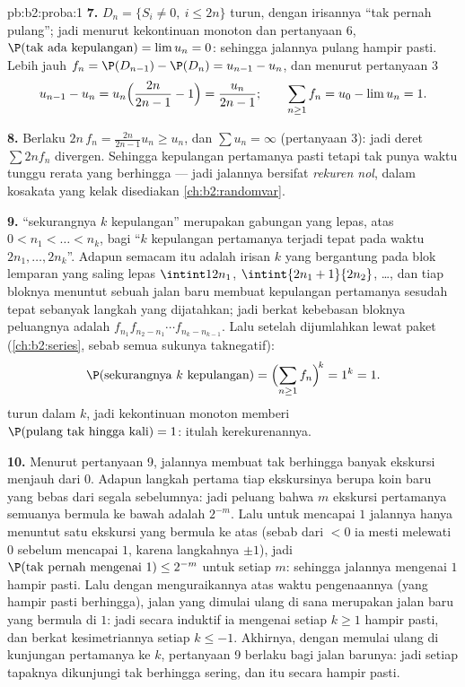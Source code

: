 \begin{solution}{pb:b2:proba:1}
\textbf{7.}  $D_n = \{S_i \neq 0,\ i \leq 2n\}$
turun, dengan irisannya ``tak pernah pulang''; jadi menurut kekontinuan
monoton dan pertanyaan 6, $\P(\text{tak ada kepulangan}) = \lim u_n =
0$: sehingga jalannya pulang hampir pasti. Lebih jauh $f_n = \P(D_{n-1})
- \P(D_n) = u_{n-1} - u_n$, dan menurut pertanyaan 3
\[
u_{n-1} - u_n = u_n\Bigl(\frac{2n}{2n-1} - 1\Bigr) =
\frac{u_n}{2n-1};
\qquad
\sum_{n\geq1}f_n = u_0 - \lim u_n = 1 .
\]

\textbf{8.} Berlaku $2n\,f_n = \frac{2n}{2n-1}u_n \geq u_n$, dan
$\sum u_n = \infty$ (pertanyaan 3): jadi deret $\sum 2nf_n$
divergen. Sehingga kepulangan pertamanya pasti tetapi tak punya waktu tunggu
rerata yang berhingga --- jadi jalannya bersifat \emph{rekuren nol}, dalam
kosakata yang kelak disediakan \cref{ch:b2:randomvar}.

\textbf{9.}  ``sekurangnya $k$ kepulangan'' merupakan
gabungan  yang lepas, atas $0 < n_1 < \dots < n_k$, bagi
 ``$k$ kepulangan pertamanya terjadi tepat pada waktu
$2n_1, \dots, 2n_k$''. Adapun  semacam itu adalah irisan
$k$  yang bergantung pada blok lemparan yang saling lepas
$\intint1{2n_1}$, $\intint{2n_1+1}{2n_2}$, \dots, dan tiap bloknya
menuntut sebuah jalan baru membuat kepulangan pertamanya sesudah
tepat sebanyak langkah yang dijatahkan; jadi berkat kebebasan
bloknya peluangnya adalah $f_{n_1}f_{n_2-n_1}\cdots
f_{n_k-n_{k-1}}$. Lalu setelah dijumlahkan lewat paket (\cref{ch:b2:series},
sebab semua sukunya taknegatif):
\[
\P(\text{sekurangnya }k\text{ kepulangan})
= \Bigl(\sum_{n\geq1}f_n\Bigr)^{\!k} = 1^k = 1 .
\]
 turun dalam $k$, jadi kekontinuan monoton memberi
$\P(\text{pulang tak hingga kali}) = 1$: itulah kerekurenannya.

\textbf{10.} Menurut pertanyaan 9, jalannya membuat tak berhingga banyak
ekskursi menjauh dari $0$. Adapun langkah pertama tiap ekskursinya berupa
koin baru yang bebas dari segala sebelumnya: jadi
peluang bahwa $m$ ekskursi pertamanya semuanya bermula ke bawah
adalah $2^{-m}$. Lalu untuk mencapai $1$ jalannya hanya menuntut satu ekskursi
yang bermula ke atas (sebab dari $<0$ ia mesti melewati $0$ sebelum
mencapai $1$, karena langkahnya $\pm1$), jadi $\P(\text{tak pernah mengenai }1)
\leq 2^{-m}$ untuk setiap $m$: sehingga jalannya mengenai $1$ hampir pasti.
Lalu dengan menguraikannya atas waktu pengenaannya (yang hampir pasti berhingga),
jalan yang dimulai ulang di sana merupakan jalan baru yang bermula di $1$: jadi
secara induktif ia mengenai setiap $k \geq 1$ hampir pasti, dan berkat
kesimetriannya setiap $k \leq -1$. Akhirnya, dengan memulai ulang di kunjungan
pertamanya ke $k$, pertanyaan 9 berlaku bagi jalan barunya: jadi setiap
tapaknya dikunjungi tak berhingga sering, dan itu secara hampir pasti.


\end{solution}
